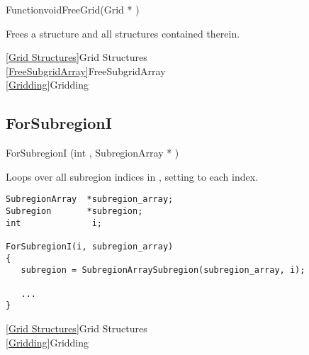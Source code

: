\begin{deftypefn}{Function}{void}{FreeGrid}({Grid *} )

\DESCRIPTION
Frees a  structure and all structures contained therein.

\SEEALSO
\vref{Grid Structures}{Grid Structures}\\
\vref{FreeSubgridArray}{FreeSubgridArray}\\
\vref{Gridding}{Gridding}

\end{deftypefn}


\newpage
\subsection{ForSubregionI}
\label{ForSubregionI}


\begin{defmac} ForSubregionI (int , {SubregionArray *} )

\DESCRIPTION
Loops over all subregion indices in , setting
 to each index.

\EXAMPLE
\mbox{}
\begin{display}\begin{verbatim}
SubregionArray  *subregion_array;
Subregion       *subregion;
int              i;

ForSubregionI(i, subregion_array)
{
   subregion = SubregionArraySubregion(subregion_array, i);

   ...
}
\end{verbatim}\end{display}

\SEEALSO
\vref{Grid Structures}{Grid Structures}\\
\vref{Gridding}{Gridding}

\end{defmac}


